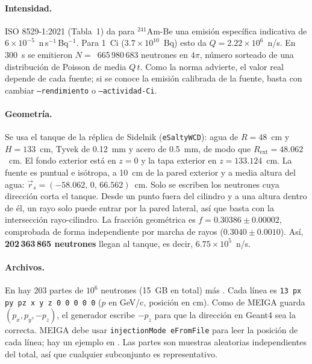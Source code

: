 \documentclass[11pt,a4paper]{article}
\begin{document}
\paragraph{Intensidad.} ISO 8529-1:2021 (Tabla~1) da para $^{241}$Am-Be una emisión específica indicativa
de $6\times10^{-5}$~n\,s$^{-1}$\,Bq$^{-1}$. Para 1~Ci ($3.7\times10^{10}$~Bq) esto da
$Q=2.22\times10^{6}$~n/s. En 300~s se emitieron $N=$~665\,980\,683 neutrones en $4\pi$, número sorteado de
una distribución de Poisson de media $Q\,t$. Como la norma advierte, el valor real depende de cada fuente;
si se conoce la emisión calibrada de la fuente, basta con cambiar \texttt{--rendimiento} o
\texttt{--actividad-Ci}.

\paragraph{Geometría.} Se usa el tanque de la réplica de Sidelnik (\texttt{eSaltyWCD}): agua de
$R=48$~cm y $H=133$~cm, Tyvek de 0.12~mm y acero de 0.5~mm, de modo que $R_\text{ext}=48.062$~cm. El
fondo exterior está en $z=0$ y la tapa exterior en $z=133.124$~cm. La fuente es puntual e isótropa, a
10~cm de la pared exterior y a media altura del agua: $\vec r_s=(-58.062,\,0,\,66.562)$~cm. Solo se
escriben los neutrones cuya dirección corta el tanque. Desde un punto fuera del cilindro y a una altura
dentro de él, un rayo solo puede entrar por la pared lateral, así que basta con la intersección
rayo-cilindro. La fracción geométrica es $f=0.30386\pm0.00002$, comprobada de forma independiente por marcha de
rayos ($0.3040\pm0.0010$). Así, \textbf{202\,363\,865 neutrones} llegan al tanque, es decir,
$6.75\times10^{5}$~n/s.

\paragraph{Archivos.} En  hay 203 partes de
$10^{6}$ neutrones (15~GB en total) más . Cada línea es
\verb|13 px py pz x y z 0 0 0 0 0| ($p$ en GeV/c, posición en cm). Como 
de MEIGA guarda $(p_x,p_y,-p_z)$, el generador escribe $-p_z$ para que la dirección en Geant4 sea la
correcta. MEIGA debe usar \texttt{injectionMode eFromFile} para leer la posición de cada línea; hay un
ejemplo en . Las partes son muestras aleatorias
independientes del total, así que cualquier subconjunto es representativo.
\end{document}

